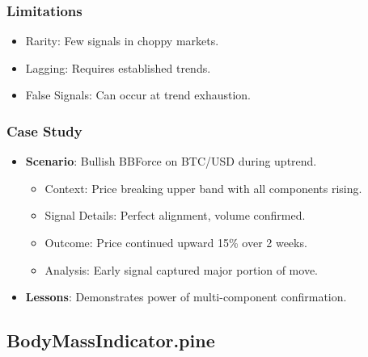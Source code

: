 \documentclass[12pt]{article}
\begin{document}
\subsubsection{Limitations}
\begin{itemize}
\item Rarity: Few signals in choppy markets.
\item Lagging: Requires established trends.
\item False Signals: Can occur at trend exhaustion.
\end{itemize}

\subsubsection{Case Study}
\begin{itemize}
\item \textbf{Scenario}: Bullish BBForce on BTC/USD during uptrend.
  \begin{itemize}
  \item Context: Price breaking upper band with all components rising.
  \item Signal Details: Perfect alignment, volume confirmed.
  \item Outcome: Price continued upward 15\% over 2 weeks.
  \item Analysis: Early signal captured major portion of move.
  \end{itemize}
\item \textbf{Lessons}: Demonstrates power of multi-component confirmation.
\end{itemize}

\subsection{BodyMassIndicator.pine}
\label{subsec:bodymass}
\end{document}
